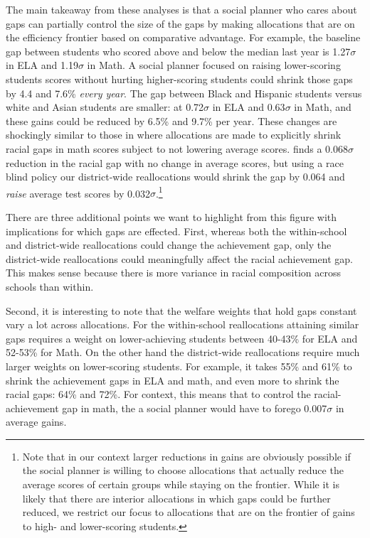 \documentclass[12pt]{article}
\theoremstyle{definition}
\theoremstyle{definition}
\theoremstyle{definition}
\theoremstyle{definition}
\begin{document}
The main takeaway from these analyses is that a social planner who cares about gaps can partially control the size of the gaps by making allocations that are on the efficiency frontier based on comparative advantage. For example, the baseline gap between students who scored above and below the median last year is 1.27$\sigma$ in ELA and 1.19$\sigma$ in Math. A social planner focused on raising lower-scoring students scores without hurting higher-scoring students could shrink those gaps by 4.4 and 7.6\% \textit{every year}. The gap between Black and Hispanic students versus white and Asian students are smaller: at 0.72$\sigma$ in ELA and 0.63$\sigma$ in Math, and these gains could be reduced by 6.5\% and 9.7\% per year. These changes are shockingly similar to those in \citet{Delgado2020} where allocations are made to explicitly shrink racial gaps in math scores subject to not lowering average scores. \citet{Delgado2020} finds a 0.068$\sigma$ reduction in the racial gap with no change in average scores, but using a race blind policy our district-wide reallocations would shrink the gap by 0.064 and \textit{raise} average test scores by 0.032$\sigma$.\footnote{Note that in our context larger reductions in gains are obviously possible if the social planner is willing to choose allocations that actually reduce the average scores of certain groups while staying on the frontier. While it is likely that there are interior allocations in which gaps could be further reduced, we restrict our focus to allocations that are on the frontier of gains to high- and lower-scoring students.} 

There are three additional points we want to highlight from this figure with implications for which gaps are effected. First,  whereas both the within-school and district-wide reallocations could change the achievement gap, only the district-wide reallocations could meaningfully affect the racial achievement gap. This makes sense because there is more variance in racial composition across schools than within. 

Second, it is interesting to note that the welfare weights that hold gaps constant vary a lot across allocations. For the within-school reallocations attaining similar gaps requires a weight on lower-achieving students between 40-43\% for ELA and 52-53\% for Math. On the other hand the district-wide reallocations require much larger weights on lower-scoring students. For example, it takes 55\% and 61\% to shrink the achievement gaps in ELA and math, and even more to shrink the racial gaps: 64\% and 72\%. For context, this means that to control the racial-achievement gap in math, the a social planner would have to forego 0.007$\sigma$ in average gains.
\end{document}
